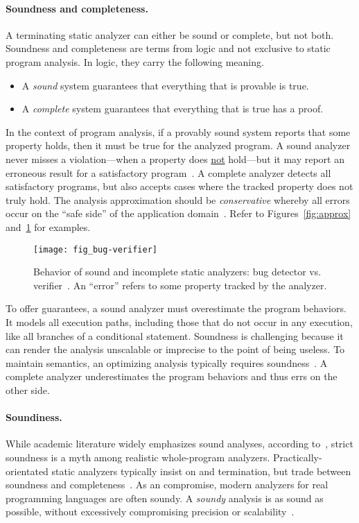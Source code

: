 \paragraph*{Soundness and completeness.}
A terminating static analyzer can either be sound or complete, but not both.
Soundness and completeness are terms from logic and not exclusive to static program analysis.
In logic, they carry the following meaning.
\begin{itemize}
\item A \emph{sound} system guarantees that everything that is provable is true.
\item A \emph{complete} system guarantees that everything that is true has a proof.
\end{itemize}
In the context of program analysis,
if a provably sound system reports that some property holds, then it must be true for the analyzed program.
A sound analyzer never misses a violation---\ie when a property does \underline{not} hold---but it may report an erroneous result for a satisfactory program~\cite{torlak2015}.
A complete analyzer detects all satisfactory programs, but also accepts cases where the tracked property does not truly hold.
The analysis approximation should be \emph{conservative}
whereby all errors occur on the \enquote{safe side} of the application domain~\cite[p. 5]{moller2023}.
Refer to Figures~\ref{fig:approx} and~\ref{fig:bug-verify} for examples.

\begin{figure}[t]
\centering
\texttt{[image: fig\_bug-verifier]}
\caption[Sound and incomplete bug detector vs. verifier]{
Behavior of sound and incomplete static analyzers: bug detector vs. verifier~\cite{moller2024}.
An \enquote{error} refers to some property tracked by the analyzer.}
\label{fig:bug-verify}
\end{figure}

To offer guarantees, a sound analyzer must overestimate the program behaviors.
It models all execution paths, including those that do not occur in any execution, like all branches of a conditional statement.
Soundness is challenging because it can render the analysis unscalable or imprecise to the point of being useless.
To maintain semantics, an optimizing analysis typically requires soundness~\cite[p. 5]{moller2023}.
A complete analyzer underestimates the program behaviors and thus errs on the other side.

\paragraph*{Soundiness.}
While academic literature widely emphasizes sound analyses, according to~\textcite{livshits2015}, strict soundness is a myth among realistic whole-program analyzers.
Practically-orientated static analyzers typically insist on  and termination,
but trade between soundness and completeness~\cite{moller2023,steffen2020}.
As an compromise, modern analyzers for real programming languages are often soundy.
A \emph{soundy} analysis is as sound as possible, without excessively compromising precision or scalability~\cite{livshits2015}.

